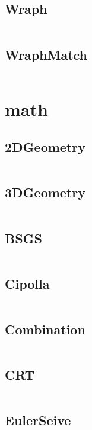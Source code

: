 \documentclass[a4]{article}
\begin{document}
\subsection{Wraph}
\inputminted[mathescape,linenos,numbersep=5pt,frame=lines,framesep=2mm]{cpp}{src/graph/Wraph.cpp}
\subsection{WraphMatch}
\inputminted[mathescape,linenos,numbersep=5pt,frame=lines,framesep=2mm]{cpp}{src/graph/WraphMatch.cpp}
\section{math}
\subsection{2DGeometry}
\inputminted[mathescape,linenos,numbersep=5pt,frame=lines,framesep=2mm]{cpp}{src/math/2DGeometry.cpp}
\subsection{3DGeometry}
\inputminted[mathescape,linenos,numbersep=5pt,frame=lines,framesep=2mm]{cpp}{src/math/3DGeometry.cpp}
\subsection{BSGS}
\inputminted[mathescape,linenos,numbersep=5pt,frame=lines,framesep=2mm]{cpp}{src/math/BSGS.cpp}
\subsection{Cipolla}
\inputminted[mathescape,linenos,numbersep=5pt,frame=lines,framesep=2mm]{cpp}{src/math/Cipolla.cpp}
\subsection{Combination}
\inputminted[mathescape,linenos,numbersep=5pt,frame=lines,framesep=2mm]{cpp}{src/math/Combination.cpp}
\subsection{CRT}
\inputminted[mathescape,linenos,numbersep=5pt,frame=lines,framesep=2mm]{cpp}{src/math/CRT.cpp}
\subsection{EulerSeive}
\inputminted[mathescape,linenos,numbersep=5pt,frame=lines,framesep=2mm]{cpp}{src/math/EulerSeive.cpp}
\end{document}
